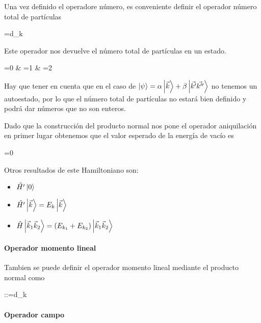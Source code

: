 Una vez definido el operadore número, es conveniente definir el operador número total de partículas 

\begin{definition}
  \begin{DispWithArrows}[format=c, displaystyle]
  =\int d_{k}
  \end{DispWithArrows}

  Este operador nos devuelve el número total de partículas en un estado. 
  \begin{DispWithArrows}[format=ccc, displaystyle]
  =0 & =1 &  =2
  \end{DispWithArrows}

  Hay que tener en cuenta que en el caso de $\ket{\psi}=\alpha \ket{\vec{k}}+\beta \ket{\vec{k'}\vec{k''}}$ no tenemos un autoestado, por lo que el número total de partículas no estará bien definido y podrá dar números que no son enteros.
\end{definition}

Dado que la construcción del producto normal nos pone el operador aniquilación en primer lugar obtenemos que el valor esperado de la energía de vacío es
\begin{DispWithArrows}[format=c, displaystyle]
=0
\end{DispWithArrows}

Otros resultados de este Hamiltoniano son:
\begin{itemize}
  \item $\hat{H'}\ket{0}$
  \item $\hat{H'}\ket{\vec{k}}=E_{k}\ket{\vec{k}}$
  \item $\hat{H}\ket{\vec{k}_{1}\vec{k}_{2}}=(E_{k_{1}}+E_{k_{2}})\ket{\vec{k}_{1}\vec{k}_{2}}$
\end{itemize}
\paragraph{Operador momento lineal }
Tambien se puede definir el operador momento lineal mediante el producto normal como 

\begin{DispWithArrows}[format=c, displaystyle]
::=\int d_{k}
\end{DispWithArrows}
\paragraph{Operador campo}

